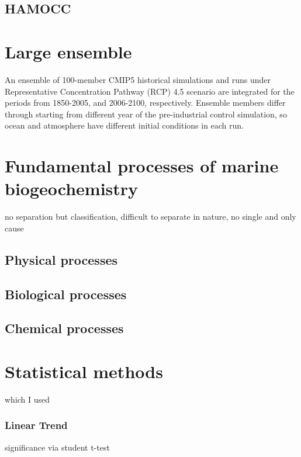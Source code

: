 \subsection{HAMOCC}

\section{Large ensemble}
An ensemble of 100-member CMIP5 historical simulations and runs under  Representative Concentration Pathway (RCP) 4.5 scenario are integrated for the periods from 1850-2005, and 2006-2100, respectively. Ensemble members differ through starting from different year of the pre-industrial control simulation, so ocean and atmosphere have different initial conditions in each run.  

\section{Fundamental processes of marine biogeochemistry}
no separation but classification, difficult to separate in nature, no single and only cause
\subsection{Physical processes}
\subsection{Biological processes}
\subsection{Chemical processes}

\section{Statistical methods}
which I used
\subsubsection*{Linear Trend}
significance via student t-test



